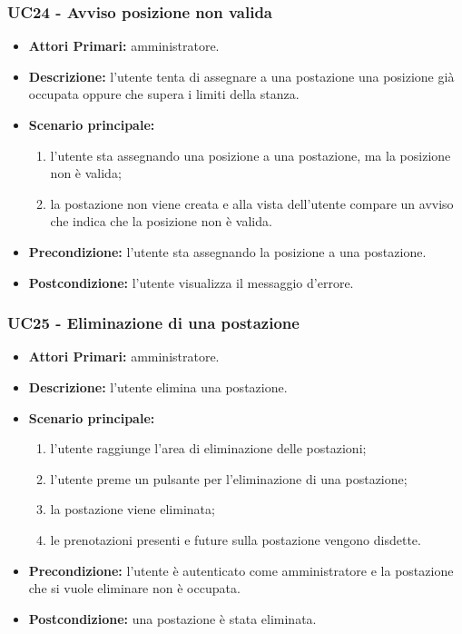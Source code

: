 \subsubsection{UC24 - Avviso posizione non valida}
\begin{itemize}
	\item\textbf{Attori Primari:}
	amministratore.
	\item\textbf{Descrizione:}
	l'utente tenta di assegnare a una postazione una posizione già occupata oppure che supera i limiti della stanza.
	\item\textbf{Scenario principale:}
	\begin{enumerate}
		\item l'utente sta assegnando una posizione a una postazione, ma la posizione non è valida;
		\item la postazione non viene creata e alla vista dell'utente compare un avviso che indica che la posizione non è valida.
	\end{enumerate}
	\item\textbf{Precondizione:}
	l'utente sta assegnando la posizione a una postazione.
	\item\textbf{Postcondizione:}
	l'utente visualizza il messaggio d'errore.
\end{itemize}

\subsubsection{UC25 - Eliminazione di una postazione}
\begin{itemize}
	\item\textbf{Attori Primari:}
	amministratore.
	\item\textbf{Descrizione:}
	l'utente elimina una postazione.
	\item\textbf{Scenario principale:} 
	\begin{enumerate}
		\item l'utente raggiunge l'area di eliminazione delle postazioni;
		\item l'utente preme un pulsante per l'eliminazione di una postazione;
		\item la postazione viene eliminata;
		\item le prenotazioni presenti e future sulla postazione vengono disdette.
	\end{enumerate}
	\item\textbf{Precondizione:} 
	l'utente è autenticato come amministratore e la postazione che si vuole eliminare non è occupata.
	\item\textbf{Postcondizione:}
	una postazione è stata eliminata.
\end{itemize}


